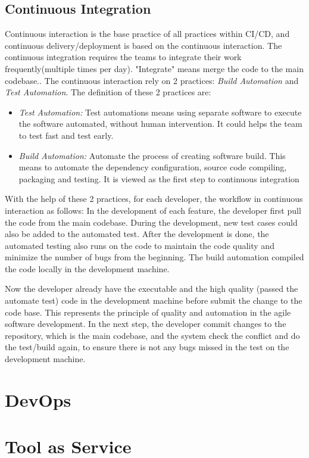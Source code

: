 \subsection{Continuous Integration}
Continuous interaction is the base practice of all practices within CI/CD, and continuous delivery/deployment is based on the continuous interaction.\cite{Continuo67:online}
The continuous integration requires the teams to integrate their work frequently(multiple times per day). "Integrate" means merge the code to the main codebase.\cite{fowler2006continuous}. The continuous interaction rely on 2 practices: \textit{Build Automation} and  \textit{Test Automation}. The definition of these 2 practices are:
\begin{itemize}
    \item \textit{Test Automation:} Test automations means using separate software to execute the software automated, without human intervention. It could helps the team to test fast and test early. \cite{Testauto48:online}
    \item \textit{Build Automation:} Automate the process of creating software build. This means to automate the dependency configuration, source code compiling, packaging and testing. It is viewed as the first step to continuous integration\cite{Buildaut62:online}
\end{itemize}
With the help of these 2 practices, for each developer, the workflow in continuous interaction as follows:\cite{fowler2006continuous} In the development of each feature, the developer first pull the code from the main codebase. During the development, new test cases could also be added to the automated test. After the development is done, the automated testing also runs on the code to maintain the code quality and minimize the number of bugs from the beginning. The build automation compiled the code locally in the development machine. 
\par
Now the developer already have the executable and the high quality (passed the automate test) code in the development machine before submit the change to the code base. This represents the principle of quality and automation in the agile software development. In the next step, the developer commit changes to the repository, which is the main codebase, and the system check the conflict and do the test/build again, to ensure there is not any bugs missed in the test on the development machine.
\section{DevOps}
\section{Tool as Service}
